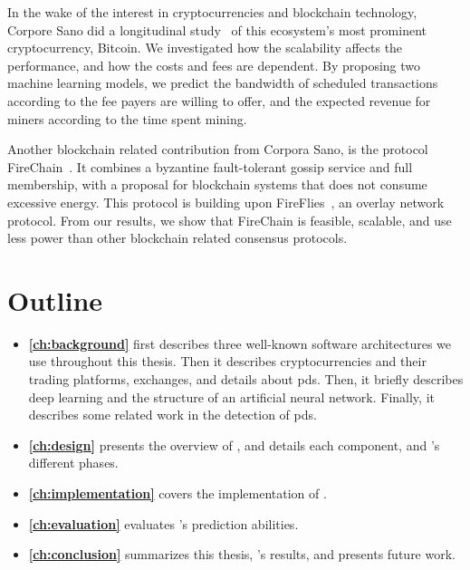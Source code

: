 In the wake of the interest in cryptocurrencies and blockchain technology, Corpore Sano did a longitudinal study~\cite{tedeschi2017trading} of this ecosystem's most prominent cryptocurrency, Bitcoin. We investigated how the scalability affects the performance, and how the costs and fees are dependent. By proposing two machine learning models, we predict the bandwidth of scheduled transactions according to the fee payers are willing to offer, and the expected revenue for miners according to the time spent mining.

Another blockchain related contribution from Corpora Sano, is the protocol FireChain~\cite{mikalsen2018firechain}. It combines a byzantine fault-tolerant gossip service and full membership, with a proposal for blockchain systems that does not consume excessive energy. This protocol is building upon FireFlies~\cite{johansen2015fireflies}, an overlay network protocol. From our results, we show that FireChain is feasible, scalable, and use less power than other blockchain related consensus protocols.

\section{Outline}\label{sec:outline}
\begin{itemize}
    \item[] \textbf{\autoref{ch:background}} first describes three well-known software architectures we use throughout this thesis. Then it describes cryptocurrencies and their trading platforms, exchanges, and details about \acp{pd}. Then, it briefly describes deep learning and the structure of an artificial neural network. Finally, it describes some related work in the detection of \acp{pd}. 
    
    \item[] \textbf{\autoref{ch:design}} presents the overview of \project, and details each component, and \project's different phases.
    
    \item[] \textbf{\autoref{ch:implementation}} covers the implementation of \project.
    
    \item[] \textbf{\autoref{ch:evaluation}} evaluates \project's prediction abilities. 
    
    \item[] \textbf{\autoref{ch:conclusion}} summarizes this thesis, \project's results, and presents future work.
 \end{itemize}